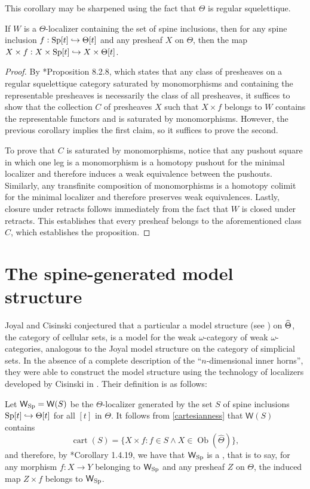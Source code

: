 This corollary may be sharpened using the fact that \(\Theta\) is regular squelettique.

\begin{prop}\label{cartesianness} If \(W\) is a \(\Theta\)-localizer containing the set of spine inclusions, then for any spine inclusion \(f:{\operatorname{Sp}}[t]\hookrightarrow \Theta[t]\) and any presheaf \(X\) on \(\Theta\), then the map \(X\times f: X\times {\operatorname{Sp}}[t]\hookrightarrow X\times \Theta[t]\).
\end{prop}
\begin{proof} By \cite{cisinski-book}*{Proposition 8.2.8}, which states that any class of presheaves on a regular squelettique category saturated by monomorphisms and containing the representable presheaves is necessarily the class of all presheaves, it suffices to show that the collection \(C\) of presheaves \(X\) such that \(X\times f\) belongs to \(W\) contains the representable functors and is saturated by monomorphisms.  However, the previous corollary implies the first claim, so it suffices to prove the second. 

To prove that \(C\) is saturated by monomorphisms, notice that any pushout square in which one leg is a monomorphism is a homotopy pushout for the minimal localizer and therefore induces a weak equivalence between the pushouts.  Similarly, any transfinite composition of monomorphisms is a homotopy colimit for the minimal localizer and therefore preserves weak equivalences.  Lastly, closure under retracts follows immediately from the fact that \(W\) is closed under retracts.  This establishes that every presheaf belongs to the aforementioned class \(C\), which establishes the proposition.
\end{proof}

\section{The spine-generated model structure}
Joyal and Cisinski conjectured that a particular a model structure (see \cite{joyal-quategory}) on \(\widehat{\Theta}\), the category of cellular sets, is a model for the weak \(\omega\)-category of weak \(\omega\)-categories, analogous to the Joyal model structure on the category of simplicial sets.  In the absence of a complete description of the ``\(n\)-dimensional inner horns'', they were able to construct the model structure using the technology of localizers developed by Cisinski in \cite{cisinski-book}. Their definition is as follows:

Let \(\mathsf{W}_{{\operatorname{Sp}}}=\mathsf{W}(S)\) be the \(\Theta\)-localizer generated by the set \(S\) of spine inclusions \({\operatorname{Sp}}[t]\hookrightarrow \Theta[t]\) for all \([t]\) in \(\Theta\).   It follows from \eqref{cartesianness} that \(\mathsf{W}(S)\) contains \[\operatorname{cart}(S)=\{X\times f: f\in S\wedge X\in \operatorname{Ob}(\widehat{\Theta})\},\] and therefore, by \cite{cisinski-book}*{Corollary 1.4.19}, we have that \(\mathsf{W}_{{\operatorname{Sp}}}\) is a , that is to say, for any morphism \(f:X\to Y\) belonging to \(\mathsf{W}_{{\operatorname{Sp}}}\) and any presheaf \(Z\) on \(\Theta\), the induced map \(Z\times f\) belongs to \(\mathsf{W}_{{\operatorname{Sp}}}\).   

